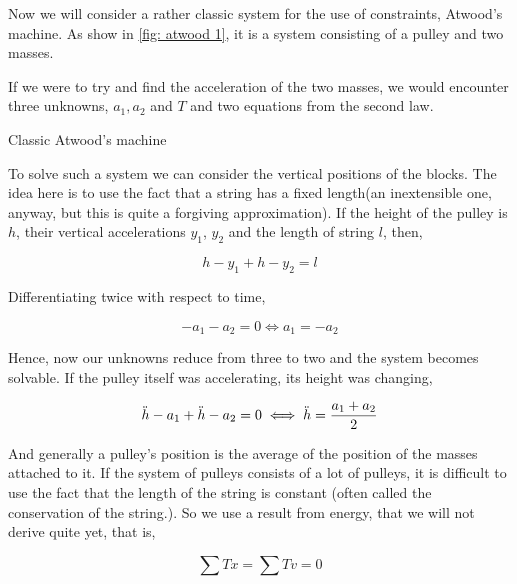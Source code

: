 \begin{marginfigure}
\end{marginfigure}

Now we will consider a rather classic system for the use of constraints,
Atwood's machine. As show in \cref{fig: atwood 1}, it is a system consisting of a pulley 
and two masses. 

If we were to try and find the acceleration of the two masses, we would encounter 
three unknowns, \(a_1, a_2\) and \(T\) and two equations from the second law.

\begin{marginfigure}
    \caption{Classic Atwood's machine}
    \label{fig: atwood 1}
\end{marginfigure}

To solve such a system we can consider the vertical positions of the blocks. The idea 
here is to use the fact that a string has a fixed length(an inextensible one, anyway, but 
this is quite a forgiving approximation). If the height of the pulley is \(h\), 
their vertical accelerations \(y_1\), \(y_2\) and the length of string \(l\), then,

\begin{equation*}
    h - y_1 + h - y_2 = l
\end{equation*}

Differentiating twice with respect to time, 

\begin{equation*}
    - a_1 - a_2 = 0 \iff a_1 = -a_2
\end{equation*}

Hence, now our unknowns reduce from three to two and the system becomes solvable.
If the pulley itself was accelerating, its height was changing,

\begin{equation*}
    \ddot{h} - a_1 + \ddot{h} - a_2 = 0 \iff \ddot{h} = \frac{a_1 + a_2}{2}
\end{equation*}

And generally a pulley's position is the average of the position of the masses attached to it.
If the system of pulleys consists of a lot of pulleys, it is difficult to use 
the fact that the length of the string is constant (often called the conservation of 
the string.). So we use a result from energy, that we will not derive quite yet, that is,

\begin{equation*}
    \sum Tx = \sum Tv = 0
\end{equation*}

